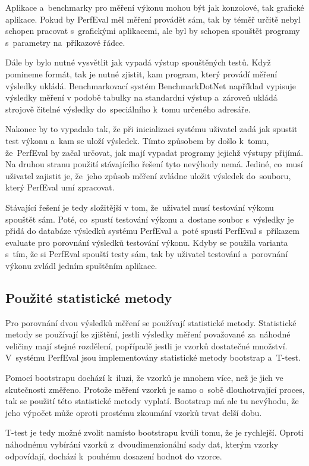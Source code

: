 Aplikace a~benchmarky pro měření výkonu mohou být jak konzolové, tak grafické aplikace. Pokud by PerfEval měl
měření provádět sám, tak by téměř určitě nebyl schopen pracovat s~grafickými aplikacemi, ale byl by schopen
spouštět programy s~parametry na~příkazové řádce.

Dále by bylo nutné vysvětlit jak vypadá výstup spouštěných testů. Když pomineme formát, tak je nutné zjistit,
kam program, který provádí měření výsledky ukládá. Benchmarkovací systém BenchmarkDotNet například vypisuje
výsledky měření v podobě tabulky na standardní výstup a~zároveň ukládá strojově čitelné výsledky do~speciálního
k~tomu určeného adresáře.

Nakonec by to vypadalo tak, že při inicializaci systému uživatel zadá jak spustit test výkonu a~kam se uloží výsledek.
Tímto způsobem by došlo k~tomu, že~PerfEval by začal určovat, jak mají vypadat programy jejichž výstupy přijímá.
Na druhou stranu použití stávajícího řešení tyto nevýhody nemá. Jediné, co~musí uživatel zajistit je, že~jeho
způsob měření zvládne uložit výsledek do~souboru, který PerfEval umí zpracovat.

Stávající řešení je tedy složitější v tom, že~uživatel musí testování výkonu spouštět sám. Poté, co~spustí testování
výkonu a~dostane soubor s~výsledky je přidá do databáze výsledků systému PerfEval a~poté spustí PerfEval s~příkazem evaluate
pro porovnání výsledků testování výkonu. Kdyby se použila varianta s~tím, že si PerfEval spouští testy sám, tak
by uživatel testování a~porovnání výkonu zvládl jedním spuštěním aplikace.

\subsection{Použité statistické metody}
Pro porovnání dvou výsledků měření se používají statistické metody. Statistické metody se používají ke zjištění,
jestli výsledky měření považované za~náhodné veličiny mají stejné rozdělení, popřípadě jestli je vzorků dostatečné množství.
V~systému PerfEval jsou implementovány statistické metody bootstrap a~T-test.

Pomocí bootstrapu dochází k~iluzi, že vzorků je mnohem více, než je jich ve skutečnosti změřeno. Protože měření vzorků
je samo o~sobě dlouhotrvající proces, tak se použití této statistické metody vyplatí. Bootstrap má ale tu nevýhodu, že jeho výpočet
může oproti prostému zkoumání vzorků trvat delší dobu.

T-test je tedy možné zvolit namísto bootstrapu kvůli tomu, že je rychlejší. Oproti náhodnému vybírání vzorků z~dvoudimenzionální sady
dat, kterým vzorky odpovídají, dochází k~pouhému dosazení hodnot do vzorce.

